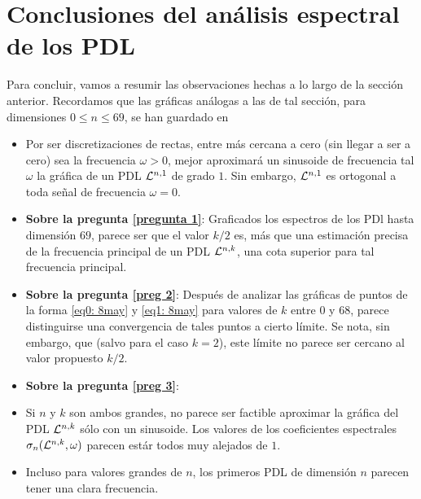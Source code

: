 \section{Conclusiones del análisis espectral de los PDL}
Para concluir,
vamos a resumir las observaciones hechas a lo largo 
de la sección anterior.
Recordamos que las gráficas análogas a las de tal sección,
para dimensiones $0 \leq n \leq 69$, se han guardado 
en 

\begin{itemize}
\item Por ser discretizaciones de rectas,
entre más cercana a cero (sin llegar
a ser a cero) sea la frecuencia
$\omega >0$, mejor aproximará un sinusoide 
de frecuencia tal $\omega$ la gráfica de un
PDL $\mathcal{L}^{n,1}$ de grado $1$. Sin embargo,
$\mathcal{L}^{n,1}$ es ortogonal a toda señal de frecuencia
$\omega = 0$.

\item \textbf{Sobre la pregunta \ref{pregunta 1}}:
Graficados los espectros de los PDl hasta dimensión $69$, parece
ser que el valor $k/2$ es, más que una estimación precisa
de la frecuencia principal de un PDL $\mathcal{L}^{n,k}$, una cota
superior para tal frecuencia principal.

\item \textbf{Sobre la pregunta \ref{preg 2}}: 
Después de analizar las gráficas 
de puntos de la forma 
\eqref{eq0: 8may} y \eqref{eq1: 8may}
para valores de $k$ entre $0$ y $68$, parece distinguirse
una convergencia de tales puntos a cierto límite.
Se nota, sin embargo, que (salvo para el caso
$k = 2$), este límite no parece ser cercano
al valor propuesto $k/2$.

\item \textbf{Sobre la pregunta \ref{preg 3}}:


\item Si $n$ y $k$ son ambos grandes, 
no parece ser factible aproximar la gráfica
del PDL $\mathcal{L}^{n,k}$ sólo con un sinusoide. Los valores
de los coeficientes espectrales $\sigma_{n}(\mathcal{L}^{n,k}, \omega)$
parecen estár todos muy alejados de $1$.
\item Incluso para valores grandes de $n$, los primeros
PDL de dimensión $n$ parecen tener una clara frecuencia.
\end{itemize}